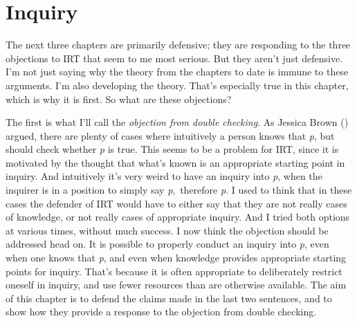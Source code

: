 \documentclass[
  12pt,
  letterpaper,
]{scrbook}
\begin{document}

\chapter{Inquiry}\label{sec-inquiry}

The next three chapters are primarily defensive; they are responding to
the three objections to IRT that seem to me most serious. But they
aren't just defensive. I'm not just saying why the theory from the
chapters to date is immune to these arguments. I'm also developing the
theory. That's especially true in this chapter, which is why it is
first. So what are these objections?

The first is what I'll call the \emph{objection from double checking}.
As Jessica Brown () argued, there are
plenty of cases where intuitively a person knows that \emph{p}, but
should check whether \emph{p} is true. This seems to be a problem for
IRT, since it is motivated by the thought that what's known is an
appropriate starting point in inquiry. And intuitively it's very weird
to have an inquiry into \emph{p}, when the inquirer is in a position to
simply say \emph{p},~therefore \emph{p}. I used to think that in these
cases the defender of IRT would have to either say that they are not
really cases of knowledge, or not really cases of appropriate inquiry.
And I tried both options at various times, without much success. I now
think the objection should be addressed head on. It is possible to
properly conduct an inquiry into \emph{p}, even when one knows that
\emph{p}, and even when knowledge provides appropriate starting points
for inquiry. That's because it is often appropriate to deliberately
restrict oneself in inquiry, and use fewer resources than are otherwise
available. The aim of this chapter is to defend the claims made in the
last two sentences, and to show how they provide a response to the
objection from double checking.
\end{document}
